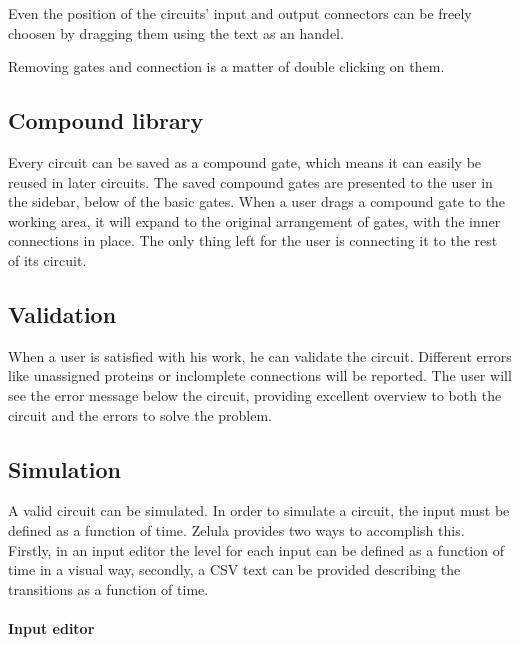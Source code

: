 Even the position of the circuits' input and output connectors can be freely choosen by dragging them using the text as an handel.

Removing gates and connection is a matter of double clicking on them.

\subsection{Compound library}
\begin{figure}[h!]
\centering{}
\end{figure}

\noindent Every circuit can be saved as a compound gate, which means it can easily be reused in later circuits. The saved compound gates are presented to the user in the sidebar, below of the basic gates. When a user drags a compound gate to the working area, it will expand to the original arrangement of gates, with the inner connections in place. The only thing left for the user is connecting it to the rest of its circuit.

\subsection{Validation}
When a user is satisfied with his work, he can validate the circuit. Different errors like unassigned proteins or inclomplete connections will be reported. The user will see the error message below the circuit, providing excellent overview to both the circuit and the errors to solve the problem.

\subsection{Simulation}
A valid circuit can be simulated. In order to simulate a circuit, the input must be defined as a function of time. Zelula provides two ways to accomplish this. Firstly, in an input editor the level for each input can be defined as a function of time in a visual way, secondly, a CSV text can be provided describing the transitions as a function of time.

\paragraph{Input editor}
\begin{figure}[h!]
\centering{}
\end{figure}

